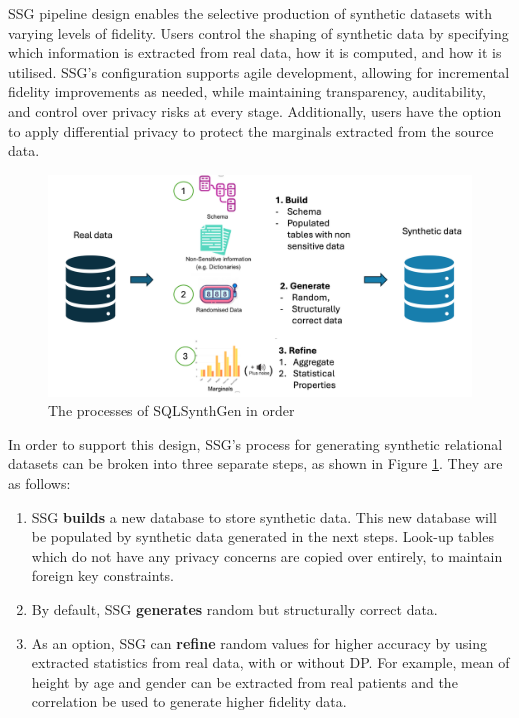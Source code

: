 \documentclass[11pt]{article}
\begin{document}
SSG pipeline design enables the selective production of synthetic datasets with varying levels of fidelity. Users control the shaping of synthetic data by specifying which information is extracted from real data, how it is computed, and how it is utilised. SSG’s configuration supports agile development, allowing for incremental fidelity improvements as needed, while maintaining transparency, auditability, and control over privacy risks at every stage. Additionally, users have the option to apply differential privacy to protect the marginals extracted from the source data.

\begin{figure}[ht]
\centering
\includegraphics[width=0.8\linewidth]{figures/Process.png}
\caption{The processes of SQLSynthGen in order}
\label{fig:SSG Process}
\end{figure}

In order to support this design, SSG's process for generating synthetic relational datasets can be broken into three separate steps, as shown in Figure \ref{fig:SSG Process}. They are as follows:

\begin{enumerate}
    \item SSG \textbf{builds} a new database to store synthetic data. This new database will be populated by synthetic data generated in the next steps. Look-up tables which do not have any privacy concerns are copied over entirely, to maintain foreign key constraints.
    \item By default, SSG \textbf{generates} random but structurally correct data. 
    \item As an option, SSG can \textbf{refine} random values for higher accuracy by using extracted statistics from real data, with or without DP. For example, mean of height by age and gender can be extracted from real patients and the correlation be used to generate higher fidelity data.
\end{enumerate}
\end{document}
